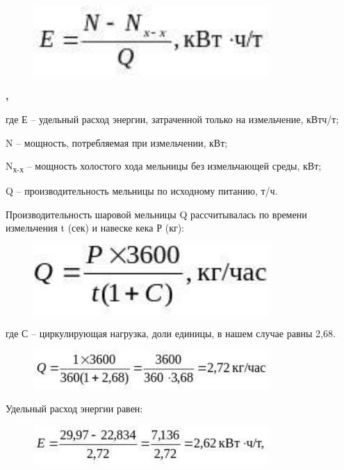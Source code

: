 \begin{figure}[H]
	\centering
	\includegraphics[width=0.8\textwidth]{assets/1036}
	\caption*{}
\end{figure}\textbf{,}

где Е -- удельный расход энергии, затраченной только на измельчение,
кВтч/т;

N -- мощность, потребляемая при измельчении, кВт;

N\textsubscript{х-х} -- мощность холостого хода мельницы без
измельчающей среды, кВт;

Q -- производительность мельницы по исходному питанию, т/ч.

Производительность шаровой мельницы Q рассчитывалась по времени
измельчения t (сек) и навеске кека Р (кг):

\begin{figure}[H]
	\centering
	\includegraphics[width=0.8\textwidth]{assets/1037}
	\caption*{}
\end{figure}

где С -- циркулирующая нагрузка, доли единицы, в нашем случае равны
2,68.

\begin{figure}[H]
	\centering
	\includegraphics[width=0.8\textwidth]{assets/1038}
	\caption*{}
\end{figure}

Удельный расход энергии равен:

\begin{figure}[H]
	\centering
	\includegraphics[width=0.8\textwidth]{assets/1039}
	\caption*{}
\end{figure}

